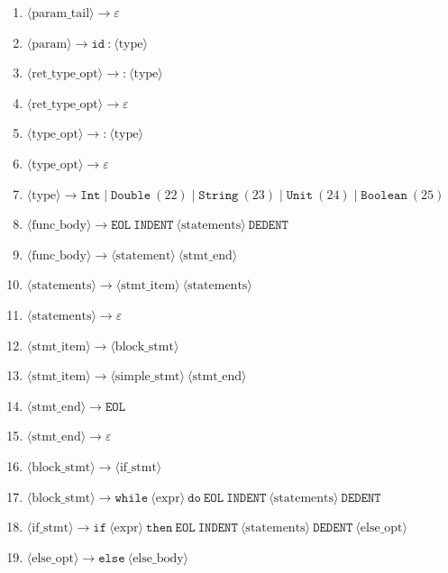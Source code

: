 \begin{enumerate}
    \item $\langle\text{param\_tail}\rangle \to \varepsilon$
    \item $\langle\text{param}\rangle \to \texttt{id}\ \texttt{:}\ \langle\text{type}\rangle$
    \item $\langle\text{ret\_type\_opt}\rangle \to \texttt{:}\ \langle\text{type}\rangle$
    \item $\langle\text{ret\_type\_opt}\rangle \to \varepsilon$
    \item $\langle\text{type\_opt}\rangle \to \texttt{:}\ \langle\text{type}\rangle$
    \item $\langle\text{type\_opt}\rangle \to \varepsilon$
    \item $\langle\text{type}\rangle \to \texttt{Int} \mid \texttt{Double}\ (22) \mid \texttt{String}\ (23) \mid \texttt{Unit}\ (24) \mid \texttt{Boolean}\ (25)$
    \setcounter{enumi}{25}
    \item $\langle\text{func\_body}\rangle \to \texttt{EOL}\ \texttt{INDENT}\ \langle\text{statements}\rangle\ \texttt{DEDENT}$
    \item $\langle\text{func\_body}\rangle \to \langle\text{statement}\rangle\ \langle\text{stmt\_end}\rangle$
    \item $\langle\text{statements}\rangle \to \langle\text{stmt\_item}\rangle\ \langle\text{statements}\rangle$
    \item $\langle\text{statements}\rangle \to \varepsilon$
    \item $\langle\text{stmt\_item}\rangle \to \langle\text{block\_stmt}\rangle$
    \item $\langle\text{stmt\_item}\rangle \to \langle\text{simple\_stmt}\rangle\ \langle\text{stmt\_end}\rangle$
    \item $\langle\text{stmt\_end}\rangle \to \texttt{EOL}$
    \item $\langle\text{stmt\_end}\rangle \to \varepsilon$
    \item $\langle\text{block\_stmt}\rangle \to \langle\text{if\_stmt}\rangle$
    \item $\langle\text{block\_stmt}\rangle \to \texttt{while}\ \langle\text{expr}\rangle\ \texttt{do}\ \texttt{EOL}\ \texttt{INDENT}\ \langle\text{statements}\rangle\ \texttt{DEDENT}$
    \item $\langle\text{if\_stmt}\rangle \to \texttt{if}\ \langle\text{expr}\rangle\ \texttt{then}\ \texttt{EOL}\ \texttt{INDENT}\ \langle\text{statements}\rangle\ \texttt{DEDENT}\ \langle\text{else\_opt}\rangle$
    \item $\langle\text{else\_opt}\rangle \to \texttt{else}\ \langle\text{else\_body}\rangle$

\end{enumerate}
